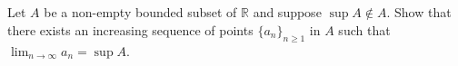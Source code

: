 \documentclass[11pt,letterpaper]{article}
\begin{document}
\section{}
Let $A$ be a non-empty bounded subset of $\mathbb{R}$ and suppose $\sup A \notin A$. Show that there exists an increasing sequence of points $\{a_n\}_{n\geq 1}$ in $A$ such that $\lim_{n\to\infty} a_n = \sup A$.






\section{}
\end{document}
